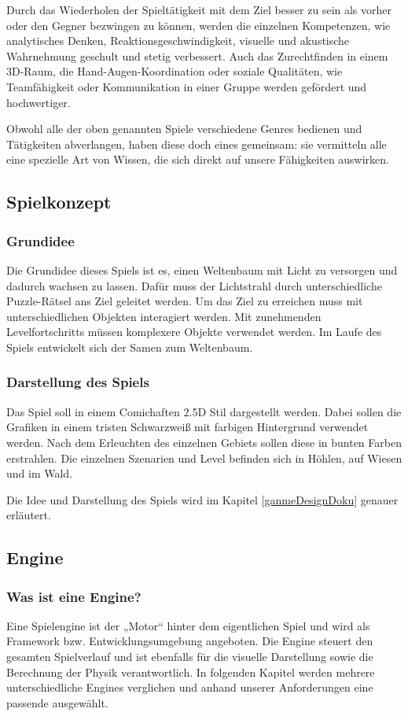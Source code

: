 Durch das Wiederholen der Spieltätigkeit mit dem Ziel besser zu sein als vorher oder den Gegner bezwingen zu können, werden die einzelnen Kompetenzen, wie analytisches Denken, Reaktionsgeschwindigkeit, visuelle und akustische Wahrnehmung geschult und stetig verbessert. Auch das Zurechtfinden in einem 3D-Raum, die Hand-Augen-Koordination oder soziale Qualitäten, wie Teamfähigkeit oder Kommunikation in einer Gruppe werden gefördert und hochwertiger. 

Obwohl alle der oben genannten Spiele verschiedene Genres bedienen und Tätigkeiten abverlangen, haben diese doch eines gemeinsam: sie vermitteln alle eine spezielle Art von Wissen, die sich direkt auf unsere Fähigkeiten auswirken. 


\subsection{Spielkonzept}
\subsubsection{Grundidee}
Die Grundidee dieses Spiels ist es, einen Weltenbaum mit Licht zu versorgen und dadurch wachsen zu lassen. Dafür muss der Lichtstrahl durch unterschiedliche Puzzle-Rätsel ans Ziel geleitet werden. Um das Ziel zu erreichen muss mit unterschiedlichen Objekten interagiert werden. Mit zunehmenden Levelfortschritts müssen komplexere Objekte verwendet werden. Im Laufe des Spiels entwickelt sich der Samen zum Weltenbaum.

\subsubsection{Darstellung des Spiels}
Das Spiel soll in einem Comichaften 2.5D Stil dargestellt werden. Dabei sollen die Grafiken in einem tristen Schwarzweiß mit farbigen Hintergrund verwendet werden. Nach dem Erleuchten des einzelnen Gebiets sollen diese in bunten Farben erstrahlen. Die einzelnen Szenarien und Level befinden sich in Höhlen, auf Wiesen und im Wald.



Die Idee und Darstellung des Spiels wird im Kapitel \ref{ganmeDesignDoku} genauer erläutert.

\subsection{Engine}
\subsubsection{Was ist eine Engine?}
Eine Spielengine ist der „Motor“ hinter dem eigentlichen Spiel und wird als Framework bzw. Entwicklungsumgebung angeboten. Die Engine steuert den gesamten Spielverlauf und ist ebenfalls für die visuelle Darstellung sowie die Berechnung der Physik verantwortlich. In folgenden Kapitel werden mehrere unterschiedliche Engines verglichen und anhand unserer Anforderungen eine passende ausgewählt. 

